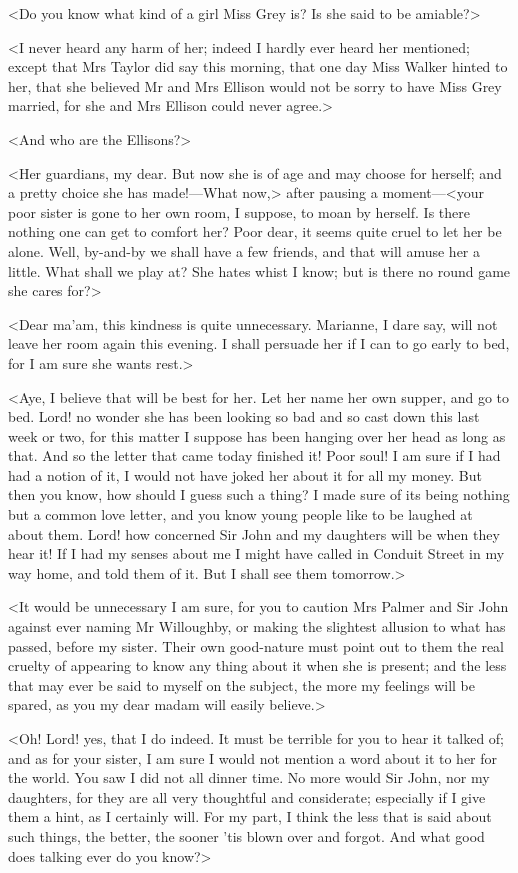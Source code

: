 <Do you know what kind of a girl Miss Grey is? Is she said to be amiable?>

<I never heard any harm of her; indeed I hardly ever heard her mentioned; except that Mrs Taylor did say this morning, that one day Miss Walker hinted to her, that she believed Mr and Mrs Ellison would not be sorry to have Miss Grey married, for she and Mrs Ellison could never agree.>

<And who are the Ellisons?>

<Her guardians, my dear. But now she is of age and may choose for herself; and a pretty choice she has made!—What now,> after pausing a moment—<your poor sister is gone to her own room, I suppose, to moan by herself. Is there nothing one can get to comfort her? Poor dear, it seems quite cruel to let her be alone. Well, by-and-by we shall have a few friends, and that will amuse her a little. What shall we play at? She hates whist I know; but is there no round game she cares for?>

<Dear ma'am, this kindness is quite unnecessary. Marianne, I dare say, will not leave her room again this evening. I shall persuade her if I can to go early to bed, for I am sure she wants rest.>

<Aye, I believe that will be best for her. Let her name her own supper, and go to bed. Lord! no wonder she has been looking so bad and so cast down this last week or two, for this matter I suppose has been hanging over her head as long as that. And so the letter that came today finished it! Poor soul! I am sure if I had had a notion of it, I would not have joked her about it for all my money. But then you know, how should I guess such a thing? I made sure of its being nothing but a common love letter, and you know young people like to be laughed at about them. Lord! how concerned Sir John and my daughters will be when they hear it! If I had my senses about me I might have called in Conduit Street in my way home, and told them of it. But I shall see them tomorrow.>

<It would be unnecessary I am sure, for you to caution Mrs Palmer and Sir John against ever naming Mr Willoughby, or making the slightest allusion to what has passed, before my sister. Their own good-nature must point out to them the real cruelty of appearing to know any thing about it when she is present; and the less that may ever be said to myself on the subject, the more my feelings will be spared, as you my dear madam will easily believe.>

<Oh! Lord! yes, that I do indeed. It must be terrible for you to hear it talked of; and as for your sister, I am sure I would not mention a word about it to her for the world. You saw I did not all dinner time. No more would Sir John, nor my daughters, for they are all very thoughtful and considerate; especially if I give them a hint, as I certainly will. For my part, I think the less that is said about such things, the better, the sooner 'tis blown over and forgot. And what good does talking ever do you know?>

